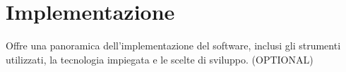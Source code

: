 \section{Implementazione}\label{sec:Implementazione}
Offre una panoramica dell'implementazione del software, 
inclusi gli strumenti utilizzati, la tecnologia impiegata 
e le scelte di sviluppo. (OPTIONAL)
\newpage